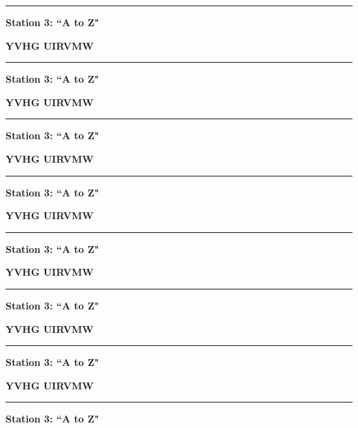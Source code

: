 \documentclass{article}
\begin{document}
\hrule
\vspace{3mm}

\textbf{Station 3: ``A to Z"}
\vspace{4mm}

\textbf{YVHG UIRVMW}
\vspace{3mm}

\hrule
\vspace{3mm}

\textbf{Station 3: ``A to Z"}
\vspace{4mm}

\textbf{YVHG UIRVMW}
\vspace{3mm}

\hrule
\vspace{3mm}

\textbf{Station 3: ``A to Z"}
\vspace{4mm}

\textbf{YVHG UIRVMW}
\vspace{3mm}

\hrule
\vspace{3mm}

\textbf{Station 3: ``A to Z"}
\vspace{4mm}

\textbf{YVHG UIRVMW}
\vspace{3mm}

\hrule
\vspace{3mm}

\textbf{Station 3: ``A to Z"}
\vspace{4mm}

\textbf{YVHG UIRVMW}
\vspace{3mm}

\hrule
\vspace{3mm}

\textbf{Station 3: ``A to Z"}
\vspace{4mm}

\textbf{YVHG UIRVMW}
\vspace{3mm}

\hrule
\vspace{3mm}

\textbf{Station 3: ``A to Z"}
\vspace{4mm}

\textbf{YVHG UIRVMW}
\vspace{3mm}

\hrule
\vspace{3mm}

\textbf{Station 3: ``A to Z"}
\vspace{4mm}
\end{document}
